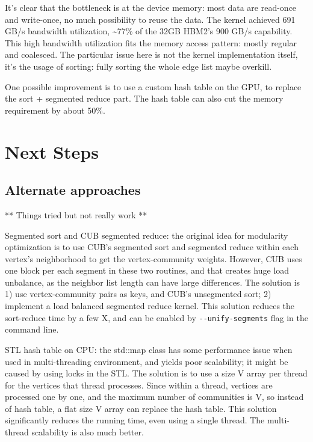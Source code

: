 \documentclass[10pt,article,oneside]{memoir}
\begin{document}
It's clear that the bottleneck is at the device memory: most data are
read-once and write-once, no much possibility to reuse the data. The
kernel achieved 691 GB/s bandwidth utilization, \textasciitilde{}77\% of
the 32GB HBM2's 900 GB/s capability. This high bandwidth utilization
fits the memory access pattern: mostly regular and coalesced. The
particular issue here is not the kernel implementation itself, it's the
usage of sorting: fully sorting the whole edge list maybe overkill.

One possible improvement is to use a custom hash table on the GPU, to
replace the sort + segmented reduce part. The hash table can also cut
the memory requirement by about 50\%.

\section{Next Steps}\label{next-steps-1}

\subsection{Alternate approaches}\label{alternate-approaches-1}

** Things tried but not really work **

Segmented sort and CUB segmented reduce: the original idea for
modularity optimization is to use CUB's segmented sort and segmented
reduce within each vertex's neighborhood to get the vertex-community
weights. However, CUB uses one block per each segment in these two
routines, and that creates huge load unbalance, as the neighbor list
length can have large differences. The solution is 1) use
vertex-community pairs as keys, and CUB's unsegmented sort; 2) implement
a load balanced segmented reduce kernel. This solution reduces the
sort-reduce time by a few X, and can be enabled by
\texttt{-\/-unify-segments} flag in the command line.

STL hash table on CPU: the std::map class has some performance issue
when used in multi-threading environment, and yields poor scalability;
it might be caused by using locks in the STL. The solution is to use a
size \textbar{}V\textbar{} array per thread for the vertices that thread
processes. Since within a thread, vertices are processed one by one, and
the maximum number of communities is \textbar{}V\textbar{}, so instead
of hash table, a flat size \textbar{}V\textbar{} array can replace the
hash table. This solution significantly reduces the running time, even
using a single thread. The multi-thread scalability is also much better.
\end{document}
